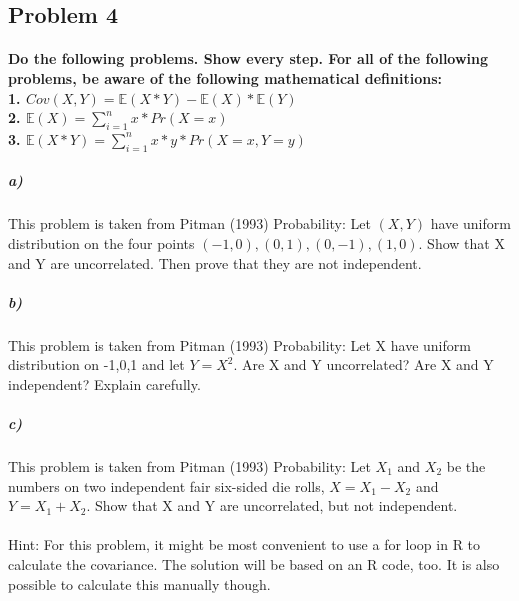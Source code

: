 \documentclass[12pt,letter]{article}
\begin{document}
\subsection*{Problem 4}

\paragraph{Do the following problems. Show every step. For all of the following problems, be aware of the following mathematical definitions:
	\bigskip
\\1. $Cov(X, Y) = \mathbb{E}(X*Y)-\mathbb{E}(X)*\mathbb{E}(Y)$
\\2. $\mathbb{E}(X) = \sum_{i=1}^{n} x * Pr(X=x)$
\\3. $\mathbb{E}(X*Y) = \sum_{i=1}^{n} x *y* Pr(X=x, Y=y)$}

\subparagraph{a)} This problem is taken from Pitman (1993) Probability: Let $(X,Y)$ have uniform distribution on the four points $(-1,0), (0,1), (0,-1), (1,0)$. Show that X and Y are uncorrelated. Then prove that they are not independent. %

\subparagraph{b)} This problem is taken from Pitman (1993) Probability: Let X have uniform distribution on {-1,0,1} and let $Y=X^2$. Are X and Y uncorrelated? Are X and Y independent? Explain carefully. %

\subparagraph{c)} This problem is taken from Pitman (1993) Probability: Let $X_{1}$ and $X_{2} $ be the numbers on two independent fair six-sided die rolls, $X = X_{1} - X_{2}$ and $Y= X_{1} + X_{2}$. Show that X and Y are uncorrelated, but not independent. %

\paragraph{} Hint: For this problem, it might be most convenient to use a for loop in R to calculate the covariance. The solution will be based on an R code, too. It is also possible to calculate this manually though.
\end{document}
